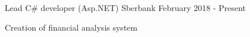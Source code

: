 



\cventry
{Lead C\# developer (Asp.NET)} %
{Sberbank} %
{} %
{February 2018 - Present} %
{ 
	\begin{cvitems}
		\item {Creation of financial analysis system}
	\end{cvitems}
}

